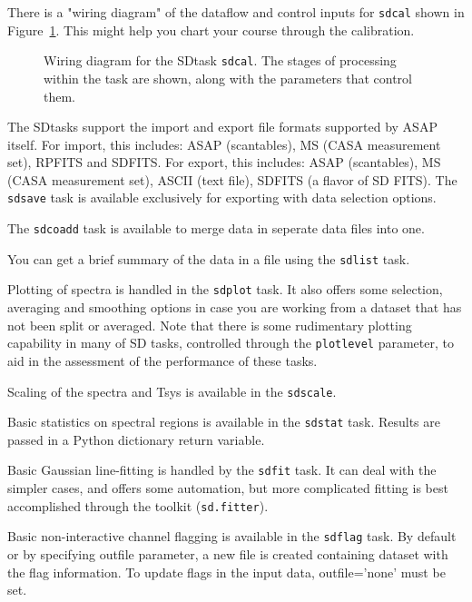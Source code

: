 There is a "wiring diagram" of the dataflow and control inputs for
{\tt sdcal} shown in Figure~\ref{fig:sdcal}.  This might help 
you chart your course through the calibration.

\begin{figure}[h!]
\caption{\label{fig:sdcal} Wiring diagram for the SDtask {\tt sdcal}.
The stages of processing within the task are shown, along with the
parameters that control them. }
\hrulefill
\end{figure}

The SDtasks support the import and export file formats supported
by ASAP itself.  For import, this includes:  ASAP (scantables), 
MS (CASA measurement set), RPFITS and SDFITS.  For export, this
includes: ASAP (scantables), MS (CASA measurement set),
ASCII (text file), SDFITS (a flavor of SD FITS).
The {\tt sdsave} task is available exclusively for exporting with 
data selection options.

The {\tt sdcoadd} task is available to merge data in seperate data files
into one.

You can get a brief summary of the data in a file using the {\tt sdlist}
task.

Plotting of spectra is handled in the {\tt sdplot} task.  It also offers
some selection, averaging and smoothing options in case you are
working from a dataset that has not been split or averaged.  Note that
there is some rudimentary plotting capability in many of SD 
tasks, controlled through the {\tt plotlevel} parameter, 
to aid in the assessment of the performance of these tasks.

Scaling of the spectra and Tsys is available in the {\tt sdscale}.

Basic statistics on spectral regions is available in the {\tt sdstat} task.
Results are passed in a Python dictionary return variable.

Basic Gaussian line-fitting is handled by the {\tt sdfit} task.  It can deal
with the simpler cases, and offers some automation, but more complicated
fitting is best accomplished through the toolkit ({\tt sd.fitter}).

Basic non-interactive channel flagging is available in the {\tt sdflag} task.
By default or by specifying outfile parameter, a new file is created containing 
dataset with the flag information. To update flags in the input data,
outfile='none' must be set.


